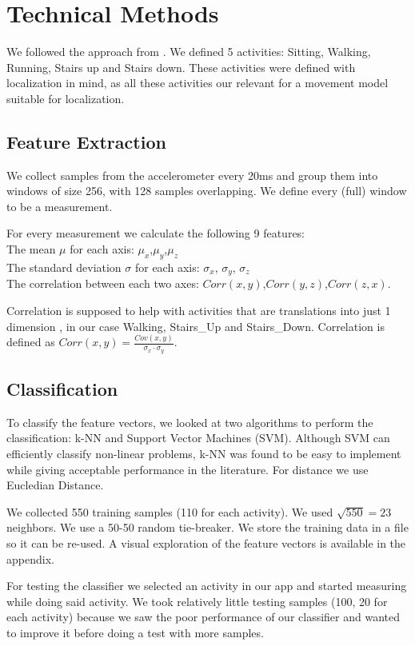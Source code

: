 \section{Technical Methods}
\label{sec:technical-methods}

We followed the approach from \cite{ravi2005activity}. We defined 5 activities: Sitting, Walking, Running, Stairs up and Stairs down. These activities were defined with localization in mind, as all these activities our relevant for a movement model suitable for localization.

\subsection{Feature Extraction}
\label{sec:feature-extraction}
We collect samples from the accelerometer every 20ms and group them into windows of size 256, with 128 samples overlapping. We define every (full) window to be a measurement.

For every measurement we calculate the following 9 features: \\
The mean $\mu$ for each axis: $\mu_x$,$\mu_y$,$\mu_z$ \\
The standard deviation $\sigma$ for each axis: $\sigma_x$, $\sigma_y$, $\sigma_z$ \\
The correlation between each two axes:  $Corr(x,y)$,$Corr(y,z)$,$Corr(z,x)$.


Correlation is supposed to help with activities that are translations into just 1 dimension \cite{ravi2005activity}, in our case Walking, Stairs\_Up and Stairs\_Down.
Correlation is defined as $
	Corr(x,y) = \frac{Cov(x,y)}{\sigma_x \cdot \sigma_y}$.

\subsection{Classification}
\label{sec:classification}
To classify the feature vectors, we looked at two algorithms to perform the classification: k-NN and Support Vector Machines (SVM). Although SVM can efficiently classify non-linear problems, k-NN was found to be easy to implement while giving acceptable performance in the literature. For distance we use Eucledian Distance.

We collected 550 training samples (110 for each activity).
We used $\sqrt{550}=23$ neighbors.
We use a 50-50 random tie-breaker.
We store the training data in a file so it can be re-used.
A visual exploration of the feature vectors is available in the appendix.

For testing the classifier we selected an activity in our app and started measuring while doing said activity.
We took relatively little testing samples (100, 20 for each activity) because we saw the poor performance of our classifier and wanted to improve it before doing a test with more samples.

